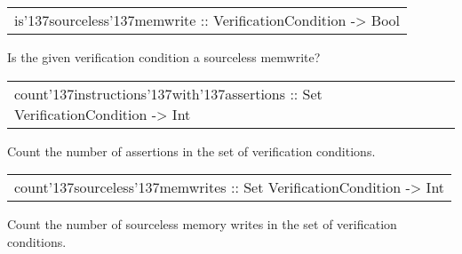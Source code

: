 \begin{haddockdesc}
\item[\begin{tabular}{@{}l}
is{\char '137}sourceless{\char '137}memwrite :: VerificationCondition -> Bool
\end{tabular}]
{\haddockbegindoc
Is the given verification condition a sourceless memwrite?\par}
\end{haddockdesc}
\begin{haddockdesc}
\item[\begin{tabular}{@{}l}
count{\char '137}instructions{\char '137}with{\char '137}assertions :: Set VerificationCondition -> Int
\end{tabular}]
{\haddockbegindoc
Count the number of assertions in the set of verification conditions.\par}
\end{haddockdesc}
\begin{haddockdesc}
\item[\begin{tabular}{@{}l}
count{\char '137}sourceless{\char '137}memwrites :: Set VerificationCondition -> Int
\end{tabular}]
{\haddockbegindoc
Count the number of sourceless memory writes in the set of verification conditions.\par}
\end{haddockdesc}